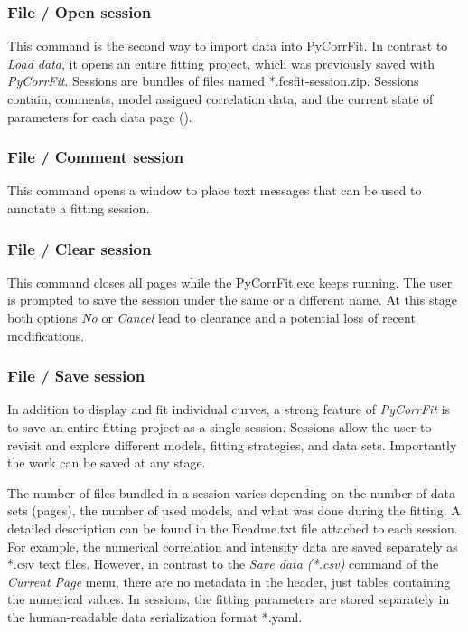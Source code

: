\subsubsection{File / Open session}
\label{sec:menub.filem.opens}
This command is the second way to import data into PyCorrFit. In contrast to \textit{Load data}, it opens an entire fitting project, which was previously saved with \textit{PyCorrFit}. Sessions are bundles of files named *.fcsfit-session.zip. Sessions contain, comments, model assigned correlation data, and the current state of parameters for each data page ().

\subsubsection{File / Comment session}
\label{sec:menub.filem.comme}
This command opens a window to place text messages that can be used to annotate a fitting session.

\subsubsection{File / Clear session}
\label{sec:menub.filem.clear}
This command closes all pages while the PyCorrFit.exe keeps running. The user is prompted to save the session under the same or a different name. At this stage both options \textit{No} or \textit{Cancel} lead to clearance and a potential loss of recent modifications.

\subsubsection{File / Save session}
\label{sec:menub.filem.saves}
In addition to display and fit individual curves, a strong feature of \textit{PyCorrFit} is to save an entire fitting project as a single session. Sessions allow the user to revisit and explore different models, fitting strategies, and data sets. Importantly the work can be saved at any stage.

The number of files bundled in a session varies depending on the number of data sets (pages), the number of used models, and what was done during the fitting. A detailed description can be found in the Readme.txt file attached to each session. For example, the numerical correlation and intensity data are saved separately as *.csv text files. However, in contrast to the \textit{Save data (*.csv)} command of the \textit{Current Page} menu, there are no metadata in the header, just tables containing the numerical values. In sessions, the fitting parameters are stored separately in the human-readable data serialization format *.yaml.

